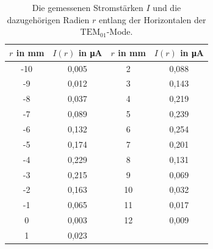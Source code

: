 \begin{table}
 \centering
 \caption{Die gemessenen Stromstärken $I$ und die dazugehörigen Radien $r$ entlang der Horizontalen der $\mathrm{TEM}_\mathrm{01}$-Mode.}
 \label{tab:T01}
 \begin{tabular}{c c c c}
   \toprule
   $r$ in mm & $I(r)$ in \si{\micro\ampere} & $r$ in mm & $I(r)$ in \si{\micro\ampere} \\
   \midrule
   -10 & 0,005 & 2 & 0,088 \\
   -9 & 0,012 & 3 & 0,143 \\
   -8 & 0,037 & 4 & 0,219 \\
   -7 & 0,089 & 5 & 0,239 \\
   -6 & 0,132 & 6 & 0,254 \\
   -5 & 0,174 & 7 & 0,201 \\
   -4 & 0,229  & 8 & 0,131 \\
   -3 & 0,215  & 9 & 0,069  \\
   -2 & 0,163 & 10 & 0,032 \\
   -1 & 0,065 & 11 & 0,017 \\
   0 & 0,003 & 12 & 0,009  \\
   1 & 0,023 &  &  \\
   \bottomrule
 \end{tabular}
\end{table}
\FloatBarrier
